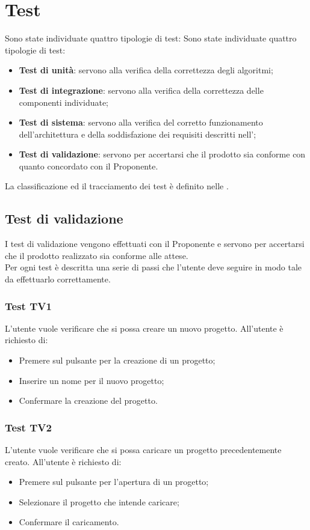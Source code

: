 \documentclass[../PianoDiQualifica.tex]{subfiles}
\begin{document}
 
	\section{Test}\label{Test} 
	Sono state individuate quattro tipologie di test: 
	Sono state individuate quattro tipologie di test: 
	\begin{itemize} 
		\item \textbf{Test di unità}: servono alla verifica della correttezza degli algoritmi; 
		\item \textbf{Test di integrazione}: servono alla verifica della correttezza delle 
		componenti individuate; 
		\item \textbf{Test di sistema}: servono alla verifica del corretto funzionamento 
		dell'architettura e della soddisfazione dei requisiti descritti nell'\analisideirequisiti; 
		\item \textbf{Test di validazione}: servono per accertarsi che il prodotto sia conforme 
		con quanto concordato con il Proponente. 
	\end{itemize} 
	La classificazione ed il tracciamento dei test è definito nelle \normediprogettov. 
	\subsection{Test di validazione} 
	I test di validazione vengono effettuati con il Proponente e servono per accertarsi che il prodotto realizzato sia conforme alle attese.\\ 
	Per ogni test è descritta 
	una serie di passi che l'utente deve seguire in modo tale da effettuarlo correttamente.  
	
	
	
	
	\subsubsection{Test TV1}  
	L'utente vuole verificare che si possa creare un nuovo progetto. 
	All'utente è richiesto di: 
	\begin{itemize} 
		\item Premere sul pulsante per la creazione di un progetto; 
		\item Inserire un nome per il nuovo progetto; 
		\item Confermare la creazione del progetto.
	\end{itemize} 
	
	\subsubsection{Test TV2} 
	L'utente vuole verificare che si possa caricare un progetto precedentemente creato. 
	All'utente è richiesto di: 
	\begin{itemize} 
		\item Premere sul pulsante per l'apertura di un progetto; 
		\item Selezionare il progetto che intende caricare; 
		\item Confermare il caricamento. 
	\end{itemize}     
	
\end{document}
